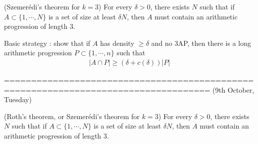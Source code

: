 \documentclass[10pt,a4paper]{report}
\begin{document}
(Szemer\'{e}di's theorem for $k=3$) For every $\delta >0$, there exists $N$ such that if $A \subset \{1, \cdots, N\}$ is a set of size at least $\delta N$, then $A$ must contain an arithmetic progression of length 3. 

\s

Basic strategy : show that if $A$ has density $\geq \delta$ and no 3AP, then there is a long arithmetic progression $P \subset \{1,\cdots,n\}$ such that
\begin{align*}
|A\cap P| \geq (\delta + c(\delta)) |P|
\end{align*}

====================================================================================
(9th October, Tuesday)
\s

(Roth's theorem, or Szemer\'{e}di's theorem for $k=3$) For every $\delta >0$, there exists $N$ such that if $A \subset \{1, \cdots, N\}$ is a set of size at least $\delta N$, then $A$ must contain an arithmetic progression of length 3. 
\s
\end{document}
